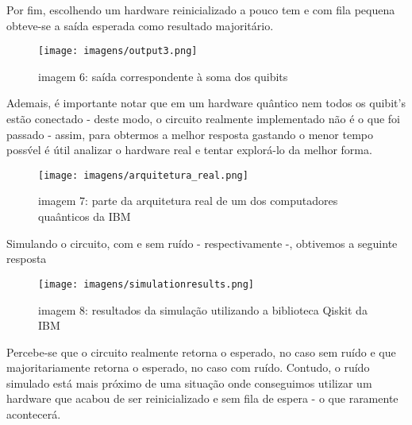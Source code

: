 \documentclass[12pt, a4paper]{article} %
\begin{document}
        Por fim, escolhendo um hardware reinicializado a pouco tem e com fila pequena obteve-se a sa\'ida esperada como resultado majorit\'ario.

        \begin{figure}[H]
        
        \centering
        
        \texttt{[image: imagens/output3.png]}
        
        imagem 6: sa\'ida correspondente \`a soma dos quibits
        
        \end{figure}

        Ademais, \'e importante notar que em um hardware qu\^antico nem todos os quibit's est\~ao conectado - deste modo, o circuito realmente implementado n\~ao \'e o que foi passado - assim, para obtermos a melhor resposta gastando o menor tempo poss\'vel \'e \'util analizar o hardware real e tentar explor\'a-lo da melhor forma.

        \begin{figure}[H]
        
        \centering
        
        \texttt{[image: imagens/arquitetura\_real.png]}
        
        imagem 7: parte da arquitetura real de um dos computadores qua\^anticos da IBM
        
        \end{figure}

        Simulando o circuito, com e sem ruído - respectivamente -, obtivemos a seguinte resposta

        \begin{figure}[H]
        
        \centering
        
        \texttt{[image: imagens/simulationresults.png]}
        
        imagem 8: resultados da simula\c{c}\~ao utilizando a biblioteca Qiskit da IBM
        
        \end{figure}

        Percebe-se que o circuito realmente retorna o esperado, no caso sem ru\'ido e que majoritariamente retorna o esperado, no caso com ru\'ido. Contudo, o ru\'ido simulado est\'a mais pr\'oximo de uma situa\c{c}\~ao onde conseguimos utilizar um hardware que acabou de ser reinicializado e sem fila de espera - o que raramente acontecer\'a.
\end{document}
